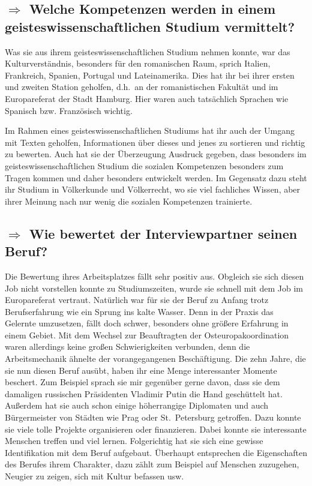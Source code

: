\documentclass[12pt,headsepline,a4paper]{scrartcl}
\newcommand\quest[1]{\subsection*{$\Rightarrow$ #1}}
\begin{document}
\quest{Welche Kompetenzen werden in einem geisteswissenschaftlichen Studium vermittelt?}
Was sie aus ihrem geisteswissenschaftlichen Studium nehmen konnte, war das Kulturverständnis, besonders für den romanischen Raum, sprich Italien, Frankreich, Spanien, Portugal und Lateinamerika. Dies hat ihr bei ihrer ersten und zweiten Station geholfen, d.h.\ an der romanistischen Fakultät und im Europareferat der Stadt Hamburg. Hier waren auch tatsächlich Sprachen wie Spanisch bzw. Französisch wichtig.

Im Rahmen eines geisteswissenschaftlichen Studiums hat ihr auch der Umgang mit Texten geholfen, Informationen über dieses und jenes zu sortieren und richtig zu bewerten. Auch hat sie der Überzeugung Ausdruck gegeben, dass besonders im geisteswissenschaftlichen Studium die sozialen Kompetenzen besonders zum Tragen kommen und daher besonders entwickelt werden. Im Gegensatz dazu steht ihr Studium in Völkerkunde und Völkerrecht, wo sie viel fachliches Wissen, aber ihrer Meinung nach nur wenig die sozialen Kompetenzen trainierte.

\quest{Wie bewertet der Interviewpartner seinen Beruf?}
Die Bewertung ihres Arbeitsplatzes fällt sehr positiv aus. Obgleich sie sich diesen Job nicht vorstellen konnte zu Studiumszeiten, wurde sie schnell mit dem Job im Europareferat vertraut. Natürlich war für sie der Beruf zu Anfang trotz Berufserfahrung wie ein Sprung ins kalte Wasser. Denn in der Praxis das Gelernte umzusetzen, fällt doch schwer, besonders ohne größere Erfahrung in einem Gebiet.
Mit dem Wechsel zur Beauftragten der Osteuropakoordination waren allerdings keine großen Schwierigkeiten verbunden, denn die Arbeitsmechanik ähnelte der vorangegangenen Beschäftigung.
Die zehn Jahre, die sie nun diesen Beruf ausübt, haben ihr eine Menge interessanter Momente beschert. Zum Beispiel sprach sie mir gegenüber gerne davon, dass sie dem damaligen russischen Präsidenten Vladimir Putin die Hand geschüttelt hat. Außerdem hat sie auch schon einige höherrangige Diplomaten  und auch Bürgermeister von Städten wie Prag oder St.\ Petersburg  getroffen.
Dazu konnte sie viele tolle Projekte organisieren oder finanzieren. Dabei konnte sie interessante Menschen treffen und viel lernen. Folgerichtig hat sie sich eine gewisse Identifikation mit dem Beruf aufgebaut.
Überhaupt entsprechen die Eigenschaften des Berufes ihrem Charakter, dazu zählt zum Beispiel auf Menschen zuzugehen, Neugier zu zeigen, sich mit Kultur befassen usw.
\end{document}
